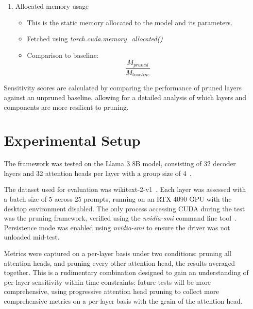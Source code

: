 \documentclass[conference]{IEEEtran}
\begin{document}
\begin{enumerate}
\begin{itemize}
        \end{itemize}
        \item Allocated memory usage
        \begin{itemize}
            \item This is the static memory allocated to the model and its parameters.
            \item Fetched using \textit{torch.cuda.memory\_allocated()}
            \item Comparison to baseline:
            \\
            \begin{equation}
                \frac{M_{pruned}}{M_{baseline}}
                \label{eq:memory_time_comparison}
            \end{equation}
        \end{itemize}
    \end{enumerate}

    Sensitivity scores are calculated by comparing the performance of pruned layers against an unpruned baseline, allowing for a detailed analysis of which layers and components are more resilient to pruning.

    \section{Experimental Setup}
    The framework was tested on the Llama 3 8B model, consisting of 32 decoder layers and 32 attention heads per layer with a group size of 4~\cite{grattafiori2024llama3herdmodels}.

    The dataset used for evaluation was wikitext-2-v1~\cite{merity2016pointersentinelmixturemodels}.
    Each layer was assessed with a batch size of 5 across 25 prompts, running on an RTX 4090 GPU with the desktop environment disabled.
    The only process accessing CUDA during the test was the pruning framework, verified using the \textit{nvidia-smi} command line tool~\cite{nvidia_smi}.
    Persistence mode was enabled using \textit{nvidia-smi} to ensure the driver was not unloaded mid-test.

    Metrics were captured on a per-layer basis under two conditions: pruning all attention heads, and pruning every other attention head, the results averaged together.
    This is a rudimentary combination designed to gain an understanding of per-layer sensitivity within time-constraints: future tests will be more comprehensive, using progressive attention head pruning to collect more comprehensive metrics on a per-layer basis with the grain of the attention head.
\end{document}
